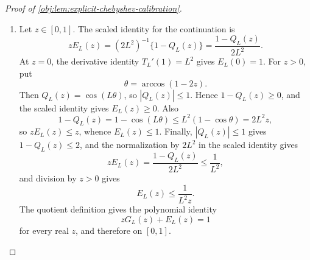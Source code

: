 \begin{proof}[Proof of \cref{obj:lem:explicit-chebyshev-calibration}]
\begin{enumerate}
The cross-arm square bound follows by the product structure. For \(j\in\mathscr I_L\), independence and \((K_{1-a})_1=K_{1-a}\) give
\[
\mathbb E\left(\frac{K_{1-a}(K_a)_j}{\mathscr D^{j+1}}\right)^2
=
\mathbb E\left(\frac{(K_a)_j}{\mathscr D^j}\right)^2
\mathbb E\left(\frac{(K_{1-a})_1}{\mathscr D}\right)^2.
\]
Applying the one-dimensional estimate to arm \(a\) with orders \((j,j)\) and to arm \(1-a\) with orders \((1,1)\) yields
\[
\mathbb E\left(\frac{K_{1-a}(K_a)_j}{\mathscr D^{j+1}}\right)^2
\le
3^L\left(1+\frac{s_a}{B}\right)^{2j}
\cdot
3^L\left(1+\frac{s_{1-a}}{B}\right)^2.
\]
Now \(1+s_a/B\le\eta\), \(1+s_{1-a}/B\le\eta\), \(\eta\ge1\), and \(2j+2\le2L\). Hence
\[
\left(1+\frac{s_a}{B}\right)^{2j}
\left(1+\frac{s_{1-a}}{B}\right)^2
\le
\eta^{2j+2}
\le
\eta^{2L},
\]
and therefore
\[
\mathbb E\left(\frac{K_{1-a}(K_a)_j}{\mathscr D^{j+1}}\right)^2
\le
9^L\eta^{2L}.
\]
Since \((\xi+\upsilon)^2\le2\xi^2+2\upsilon^2\),
\[
\mathbb E X_j(K)^2
\le
2\cdot 3^L\eta^{2L}+2\cdot 9^L\eta^{2L}
\le
36^L\eta^{2L}
=
\bigl(6^L\eta^L\bigr)^2 .
\]
The finite-sum \(L^2\) inequality
\[
\mathbb E\left(\sum_{j\in\mathscr I_L} c_jX_j\right)^2
\le
\left(\sum_{j\in\mathscr I_L}|c_j|\right)^2
\max_{j\in\mathscr I_L}\mathbb E X_j^2
\]
therefore yields
\[
\mathbb E\widehat W_{a,L}^2
\le
\|G_L\|_1^2\bigl(6^L\eta^L\bigr)^2
\le
(6^L)^2\bigl(6^L\eta^L\bigr)^2
=
1296^L\eta^{2L}.
\]
Because \(1296\le7056\),
\[
\mathbb E\widehat W_{a,L}^2
\le
7056^L\left(1+\frac pB\right)^{2L}.
\]
If \(p\le B\), then \(\eta\le2\), and hence
\[
\mathbb E\widehat W_{a,L}^2
\le
1296^L2^{2L}
=
5184^L
\le
7056^L .
\]
This proves both second-moment assertions. %

\item Let \(z\in[0,1]\). The scaled identity for the continuation is
\[
zE_L(z)=(2L^2)^{-1}\{1-Q_L(z)\}=
\frac{1-Q_L(z)}{2L^2}.
\]
At \(z=0\), the derivative identity \(T_L'(1)=L^2\) gives \(E_L(0)=1\). For \(z>0\), put
\[
\theta=\arccos(1-2z).
\]
Then \(Q_L(z)=\cos(L\theta)\), so \(|Q_L(z)|\le1\). Hence \(1-Q_L(z)\ge0\), and the scaled identity gives \(E_L(z)\ge0\). Also
\[
1-Q_L(z)
=
1-\cos(L\theta)
\le
L^2(1-\cos\theta)
=
2L^2z,
\]
so \(zE_L(z)\le z\), whence \(E_L(z)\le1\). Finally, \(|Q_L(z)|\le1\) gives \(1-Q_L(z)\le2\), and the normalization by \(2L^2\) in the scaled identity gives
\[
zE_L(z)
=
\frac{1-Q_L(z)}{2L^2}
\le
\frac1{L^2},
\]
and division by \(z>0\) gives
\[
E_L(z)\le\frac1{L^2z}.
\]
The quotient definition gives the polynomial identity
\[
zG_L(z)+E_L(z)=1
\]
for every real \(z\), and therefore on \([0,1]\). %
\end{enumerate}
\end{proof}
